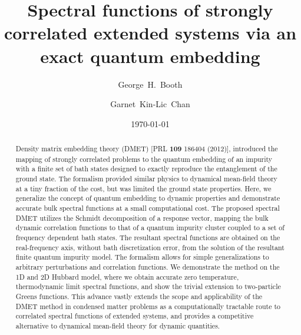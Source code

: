 \documentclass[aps,twocolumn,nobibnotes]{revtex4}
\begin{document}
\title{Spectral functions of strongly correlated extended systems via an exact quantum embedding}
\author{George~H.~Booth}
\author{Garnet~Kin-Lic~Chan}  

\begin{abstract}
Density matrix embedding theory (DMET) [PRL {\bf 109} 186404 (2012)], introduced the mapping of strongly correlated problems to the quantum embedding
of an impurity with a finite set of bath states designed to exactly reproduce the entanglement of the ground state. The formalism
provided similar physics to dynamical mean-field theory at a tiny fraction of the cost, but was limited the ground state properties.
Here, we generalize the concept of quantum embedding to dynamic properties and demonstrate accurate bulk spectral functions at a small
computational cost. 
The proposed spectral DMET utilizes the Schmidt decomposition of a response vector, mapping the bulk dynamic correlation functions to that of
a quantum impurity cluster coupled to a set of frequency dependent bath states.
The resultant spectral functions are obtained on the real-frequency axis, without bath discretization error, from the solution of the resultant
finite quantum impurity model. The formalism allows for simple generalizations to arbitrary perturbations and correlation functions.
We demonstrate the method on the 1D and 2D Hubbard model, where we obtain accurate 
zero temperature, thermodynamic limit spectral functions, and show the trivial extension to two-particle Greens functions. 
This advance vastly extends the scope and applicability 
of the DMET method in condensed matter problems as a computationally tractable route to correlated spectral functions of extended systems, 
and provides a competitive alternative to dynamical mean-field theory for dynamic quantities.
\end{abstract}
\date{\today}
\maketitle
\end{document}
